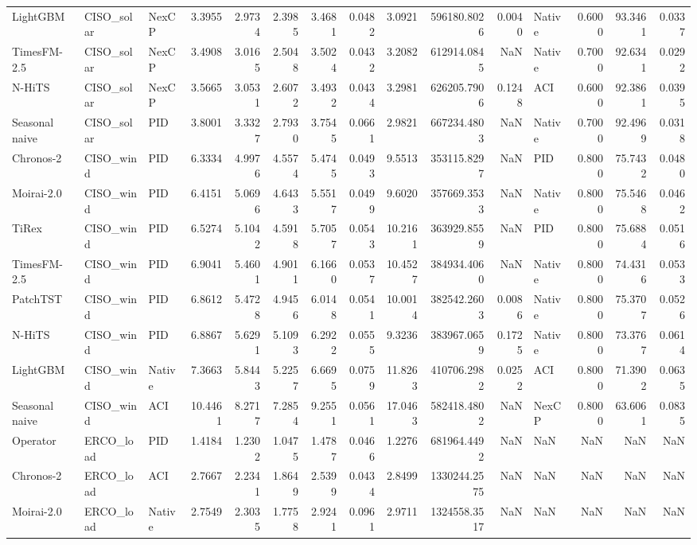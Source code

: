 \begin{tabular}{lllrrrrrrrrlrrr}
LightGBM & CISO_solar & NexCP & 3.3955 & 2.9734 & 2.3985 & 3.4681 & 0.0482 & 3.0921 & 596180.8026 & 0.0040 & Native & 0.6000 & 93.3461 & 0.0337 \\
TimesFM-2.5 & CISO_solar & NexCP & 3.4908 & 3.0165 & 2.5048 & 3.5024 & 0.0432 & 3.2082 & 612914.0845 & NaN & Native & 0.7000 & 92.6341 & 0.0292 \\
N-HiTS & CISO_solar & NexCP & 3.5665 & 3.0531 & 2.6072 & 3.4932 & 0.0434 & 3.2981 & 626205.7906 & 0.1248 & ACI & 0.6000 & 92.3861 & 0.0395 \\
Seasonal naive & CISO_solar & PID & 3.8001 & 3.3327 & 2.7930 & 3.7545 & 0.0661 & 2.9821 & 667234.4803 & NaN & Native & 0.7000 & 92.4969 & 0.0318 \\
Chronos-2 & CISO_wind & PID & 6.3334 & 4.9976 & 4.5574 & 5.4745 & 0.0493 & 9.5513 & 353115.8297 & NaN & PID & 0.8000 & 75.7432 & 0.0480 \\
Moirai-2.0 & CISO_wind & PID & 6.4151 & 5.0696 & 4.6433 & 5.5517 & 0.0499 & 9.6020 & 357669.3533 & NaN & Native & 0.8000 & 75.5468 & 0.0462 \\
TiRex & CISO_wind & PID & 6.5274 & 5.1042 & 4.5918 & 5.7057 & 0.0543 & 10.2161 & 363929.8559 & NaN & PID & 0.8000 & 75.6884 & 0.0516 \\
TimesFM-2.5 & CISO_wind & PID & 6.9041 & 5.4601 & 4.9011 & 6.1660 & 0.0537 & 10.4527 & 384934.4060 & NaN & Native & 0.8000 & 74.4316 & 0.0533 \\
PatchTST & CISO_wind & PID & 6.8612 & 5.4728 & 4.9456 & 6.0148 & 0.0541 & 10.0014 & 382542.2603 & 0.0086 & Native & 0.8000 & 75.3707 & 0.0526 \\
N-HiTS & CISO_wind & PID & 6.8867 & 5.6291 & 5.1093 & 6.2922 & 0.0555 & 9.3236 & 383967.0659 & 0.1725 & Native & 0.8000 & 73.3767 & 0.0614 \\
LightGBM & CISO_wind & Native & 7.3663 & 5.8443 & 5.2257 & 6.6695 & 0.0759 & 11.8263 & 410706.2982 & 0.0252 & ACI & 0.8000 & 71.3902 & 0.0635 \\
Seasonal naive & CISO_wind & ACI & 10.4461 & 8.2717 & 7.2854 & 9.2551 & 0.0561 & 17.0463 & 582418.4802 & NaN & NexCP & 0.8000 & 63.6061 & 0.0835 \\
Operator & ERCO_load & PID & 1.4184 & 1.2302 & 1.0475 & 1.4787 & 0.0466 & 1.2276 & 681964.4492 & NaN & NaN & NaN & NaN & NaN \\
Chronos-2 & ERCO_load & ACI & 2.7667 & 2.2341 & 1.8649 & 2.5399 & 0.0434 & 2.8499 & 1330244.2575 & NaN & NaN & NaN & NaN & NaN \\
Moirai-2.0 & ERCO_load & Native & 2.7549 & 2.3035 & 1.7758 & 2.9241 & 0.0961 & 2.9711 & 1324558.3517 & NaN & NaN & NaN & NaN & NaN \\

\end{tabular}
